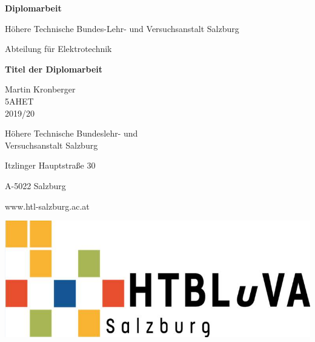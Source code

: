 \vspace*{30mm}
\begin{center} 
\begin{Huge}\textbf{Diplomarbeit}\end{Huge} \par \bigskip 
\begin{Large}Höhere Technische Bundes-Lehr- und Versuchsanstalt Salzburg \par \bigskip 
Abteilung für Elektrotechnik\end{Large} 
\vspace*{20mm}

\begin{Huge}\textbf{Titel der Diplomarbeit \\[1ex]}\end{Huge}
\vspace{\fill}
\begin{Large}Martin Kronberger\\5AHET\\2019/20 \par \bigskip \end{Large} 
\end{center}
\vspace{\fill}


\begin{minipage}{0.5\textwidth}
Höhere Technische Bundeslehr- und \\
Versuchsanstalt Salzburg \par \medskip 
Itzlinger Hauptstraße 30 \par \medskip 
A-5022 Salzburg \par \medskip 
www.htl-salzburg.ac.at
\end{minipage}
\begin{minipage}{0.5\textwidth} \hspace*{\fill}
{\includegraphics[scale=0.25]{Illustrations/HTL_logo.png}} \hspace{\fill}
\end{minipage}

\newpage
